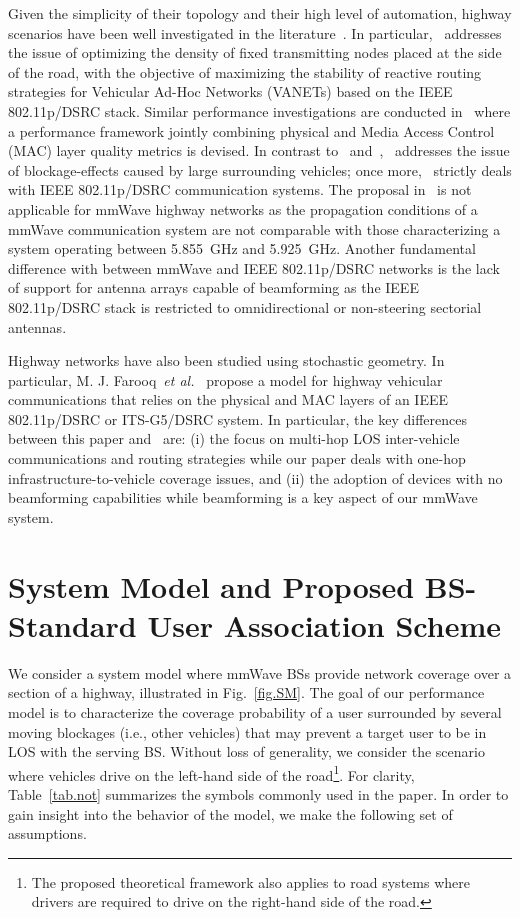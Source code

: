 \documentclass[10pt,journal,a4paper]{IEEEtran}
\begin{document}
Given the simplicity of their topology and their high level of automation, highway scenarios have been well investigated in the literature~\cite{RW0,RW2,RW1}. In particular,~\cite{RW0} addresses the issue of optimizing the density of fixed transmitting nodes placed at the side of the road, with the objective of maximizing the stability of reactive routing strategies for Vehicular Ad-Hoc Networks (VANETs) based on the IEEE 802.11p/DSRC stack.
Similar performance investigations are conducted in~\cite{RW2} where a performance framework jointly combining physical and Media Access Control (MAC) layer quality metrics is devised.
In contrast to~\cite{RW0} and~\cite{RW2},~\cite{RW1} addresses the issue of blockage-effects caused by large surrounding vehicles; once more,~\cite{RW1} strictly deals with IEEE 802.11p/DSRC communication systems. The proposal in~\cite{RW0,RW2,RW1} is not applicable for mmWave highway networks as the propagation conditions of a mmWave communication system are not comparable with those characterizing a system operating between \SI{5.855}{\giga\hertz} and \SI{5.925}{\giga\hertz}.
Another fundamental difference with between mmWave and IEEE 802.11p/DSRC networks is the lack of support for antenna arrays capable of beamforming as the IEEE 802.11p/DSRC stack is restricted to omnidirectional or non-steering sectorial antennas.

Highway networks have also been studied using stochastic geometry. In particular, M. J. Farooq~\textit{et al.}~\cite{RW4} propose a model for highway vehicular communications that relies on the physical and MAC layers of an IEEE 802.11p/DSRC or ITS-G5/DSRC system. In particular, the key differences between this paper and~\cite{RW4} are: (i) the focus on multi-hop LOS inter-vehicle communications and routing strategies while our paper deals with one-hop infrastructure-to-vehicle coverage issues, and (ii) the adoption of devices with no beamforming capabilities while beamforming is a key aspect of our mmWave system.


\section{System Model and Proposed BS-Standard User Association Scheme}\label{sec:SM}
We consider a system model where mmWave BSs provide network coverage over a section of a highway, illustrated in Fig.~\ref{fig.SM}. The goal of our performance model is to characterize the coverage probability of a user surrounded by several moving blockages (i.e., other vehicles) that may  prevent a target user to be in LOS with the serving BS. Without loss of generality, we consider the scenario where vehicles drive on the left-hand side of the road\footnote{The proposed theoretical framework also applies to road systems where drivers are required to drive on the right-hand side of the road.}. For clarity, Table~\ref{tab.not} summarizes the symbols commonly used in the paper. In order to gain insight into the behavior of the model, we make the following set of assumptions.
\end{document}
